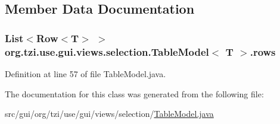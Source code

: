 \subsection{Member Data Documentation}
\hypertarget{classorg_1_1tzi_1_1use_1_1gui_1_1views_1_1selection_1_1_table_model_3_01_t_01_4_a105084784baa09767d3a932ffe07ab0d}{
\subsubsection[{rows}]{\setlength{\rightskip}{0pt plus 5cm}List$<$Row$<$T$>$ $>$ org.\-tzi.\-use.\-gui.\-views.\-selection.\-Table\-Model$<$ T $>$.rows\hspace{0.3cm}{\ttfamily [protected]}}}\label{classorg_1_1tzi_1_1use_1_1gui_1_1views_1_1selection_1_1_table_model_3_01_t_01_4_a105084784baa09767d3a932ffe07ab0d}


Definition at line 57 of file Table\-Model.\-java.



The documentation for this class was generated from the following file\-:\begin{DoxyCompactItemize}
\item 
src/gui/org/tzi/use/gui/views/selection/\hyperlink{_table_model_8java}{Table\-Model.\-java}\end{DoxyCompactItemize}

